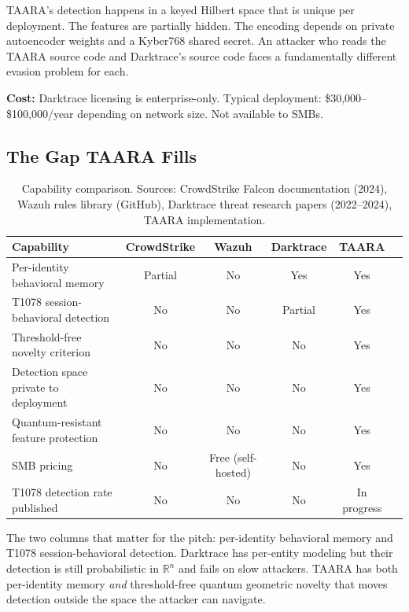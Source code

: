 \documentclass[11pt,a4paper]{article}
\begin{document}
TAARA's detection happens in a keyed Hilbert space that is unique per deployment. The features are partially hidden. The encoding depends on private autoencoder weights and a Kyber768 shared secret. An attacker who reads the TAARA source code and Darktrace's source code faces a fundamentally different evasion problem for each.

\textbf{Cost:} Darktrace licensing is enterprise-only. Typical deployment: \$30,000--\$100,000/year depending on network size. Not available to SMBs.

\subsection{The Gap TAARA Fills}

\begin{table}[H]
\centering\small
\begin{tabular}{@{}p{4cm}ccccc@{}}
\toprule
Capability & CrowdStrike & Wazuh & Darktrace & \textbf{TAARA} \\
\midrule
Per-identity behavioral memory & Partial & No & Yes & Yes \\
T1078 session-behavioral detection & No & No & Partial & Yes \\
Threshold-free novelty criterion & No & No & No & Yes \\
Detection space private to deployment & No & No & No & Yes \\
Quantum-resistant feature protection & No & No & No & Yes \\
SMB pricing & No & Free (self-hosted) & No & Yes \\
T1078 detection rate published & No & No & No & In progress \\
\bottomrule
\end{tabular}
\caption{Capability comparison. Sources: CrowdStrike Falcon documentation (2024), Wazuh rules library (GitHub), Darktrace threat research papers (2022--2024), TAARA implementation.}
\end{table}

The two columns that matter for the pitch: per-identity behavioral memory and T1078 session-behavioral detection. Darktrace has per-entity modeling but their detection is still probabilistic in $\mathbb{R}^n$ and fails on slow attackers. TAARA has both per-identity memory \textit{and} threshold-free quantum geometric novelty that moves detection outside the space the attacker can navigate.

\end{document}
